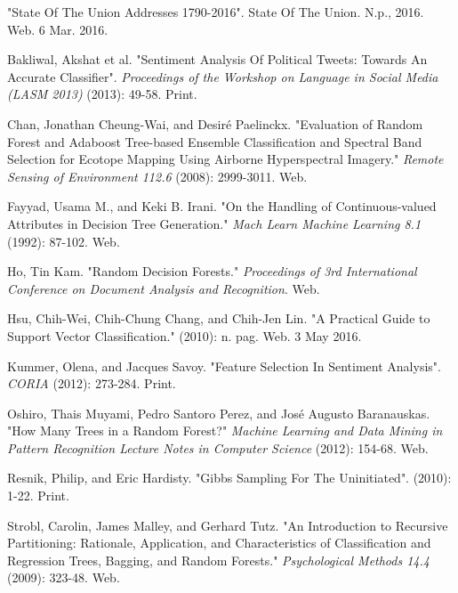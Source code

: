 \documentclass{amsart}
\theoremstyle{definition}
\theoremstyle{remark}
\numberwithin{equation}{section}
\begin{document}
\begin{thebibliography}{9}
"State Of The Union Addresses 1790-2016". State Of The Union. N.p., 2016. Web. 6 Mar. 2016.

Bakliwal, Akshat et al. "Sentiment Analysis Of Political Tweets: Towards An Accurate Classifier". \textit{Proceedings of the Workshop on Language in Social Media (LASM 2013)} (2013): 49-58. Print.

Chan, Jonathan Cheung-Wai, and Desiré Paelinckx. "Evaluation of Random Forest and Adaboost Tree-based Ensemble Classification and Spectral Band Selection for Ecotope Mapping Using Airborne Hyperspectral Imagery." \textit{Remote Sensing of Environment 112.6} (2008): 2999-3011. Web.

Fayyad, Usama M., and Keki B. Irani. "On the Handling of Continuous-valued Attributes in Decision Tree Generation." \textit{Mach Learn Machine Learning 8.1} (1992): 87-102. Web.

Ho, Tin Kam. "Random Decision Forests." \textit{Proceedings of 3rd International Conference on Document Analysis and Recognition}. Web.

Hsu, Chih-Wei, Chih-Chung Chang, and Chih-Jen Lin. "A Practical Guide to Support Vector Classification." (2010): n. pag. Web. 3 May 2016.

Kummer, Olena, and Jacques Savoy. "Feature Selection In Sentiment Analysis". \textit{CORIA} (2012): 273-284. Print.

Oshiro, Thais Muyami, Pedro Santoro Perez, and José Augusto Baranauskas. "How Many Trees in a Random Forest?" \textit{Machine Learning and Data Mining in Pattern Recognition Lecture Notes in Computer Science} (2012): 154-68. Web.

Resnik, Philip, and Eric Hardisty. "Gibbs Sampling For The Uninitiated". (2010): 1-22. Print.

Strobl, Carolin, James Malley, and Gerhard Tutz. "An Introduction to Recursive Partitioning: Rationale, Application, and Characteristics of Classification and Regression Trees, Bagging, and Random Forests." \textit{Psychological Methods 14.4} (2009): 323-48. Web.

\end{thebibliography}

\newpage
\end{document}
